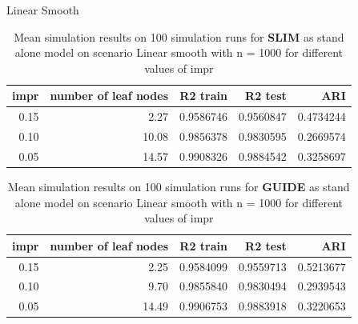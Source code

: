 \documentclass[9pt, xcolor=table]{beamer}
\begin{document}
\begin{frame}{Linear Smooth}

\begin{table}
\caption{Mean simulation results on 100 simulation runs for \textbf{SLIM} as stand alone model on scenario Linear smooth with n = 1000 for different values of impr}
\centering \small
\begin{tabular}[t]{r|r|r|r|r}
\hline
impr & number of leaf nodes & R2 train & R2 test & ARI\\
\hline
0.15 & 2.27 & 0.9586746 & 0.9560847 & 0.4734244\\
\hline
0.10 & 10.08 & 0.9856378 & 0.9830595 & 0.2669574\\
\hline
0.05 & 14.57 & 0.9908326 & 0.9884542 & 0.3258697\\
\hline
\end{tabular}
\end{table}


\begin{table}

\caption{Mean simulation results on 100 simulation runs for \textbf{GUIDE} as stand alone model on scenario Linear smooth with n = 1000 for different values of impr}
\centering \small
\begin{tabular}[t]{r|r|r|r|r}
\hline
impr & number of leaf nodes & R2 train & R2 test & ARI\\
\hline
0.15 & 2.25 & 0.9584099 & 0.9559713 & 0.5213677\\
\hline
0.10 & 9.70 & 0.9855840 & 0.9830494 & 0.2939543\\
\hline
0.05 & 14.49 & 0.9906753 & 0.9883918 & 0.3220653\\
\hline
\end{tabular}
\end{table}
    
\end{frame}
\end{document}
